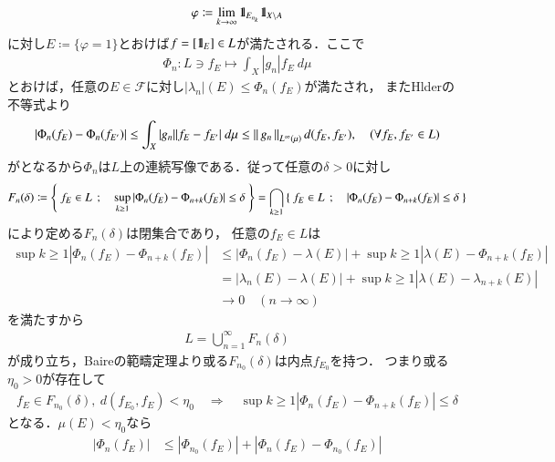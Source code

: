 \begin{prf}
\begin{description}
\begin{align}
					\varphi \coloneqq \lim_{k \to \infty} \mbox{1}\hspace{-0.25em}\mbox{l}_{E_{n_k}} \mbox{1}\hspace{-0.25em}\mbox{l}_{X \backslash A}
				\end{align}
				に対し$E \coloneqq \{\varphi = 1\}$とおけば$f = [\mbox{1}\hspace{-0.25em}\mbox{l}_E] \in L$が満たされる．ここで
				\begin{align}
					\Phi_n: L \ni f_E \longmapsto \int_X |g_n| f_E\ d\mu
				\end{align}
				とおけば，任意の$E \in \mathscr{F}$に対し$|\lambda_n|(E) \leq \Phi_n(f_E)$が満たされ，
				またHlderの不等式より
				\begin{align}
					\left| \Phi_n(f_E) - \Phi_n(f_{E'}) \right|
					\leq \int_X |g_n| |f_E - f_{E'}|\ d\mu
					\leq \left\|\, g_n\, \right\|_{L^\infty(\mu)} d(f_E,f_{E'}),
					\quad (\forall f_E,f_{E'} \in L)
				\end{align}
				がとなるから$\Phi_n$は$L$上の連続写像である．従って任意の$\delta > 0$に対し
				\begin{align}
					F_n(\delta) 
					\coloneqq \left\{\ f_E \in L\ \, ; \quad \operatorname*{sup}_{k \geq 1} \left| \Phi_n(f_E)-\Phi_{n+k}(f_E) \right| \leq \delta\ \right\}
					= \bigcap_{k \geq 1} \left\{\ f_E \in L\ \, ; \quad \left| \Phi_n(f_E)-\Phi_{n+k}(f_E) \right| \leq \delta\ \right\}
				\end{align}
				により定める$F_n(\delta)$は閉集合であり，
				任意の$f_E \in L$は
				\begin{align}
					\sup{k \geq 1}{\left| \Phi_n(f_E)-\Phi_{n+k}(f_E) \right|}
					&\leq \left| \Phi_n(f_E)-\lambda(E) \right|
						+ \sup{k \geq 1}{\left| \lambda(E)-\Phi_{n+k}(f_E) \right|} \\
					&= \left| \lambda_n(E)-\lambda(E) \right|
						+ \sup{k \geq 1}{\left| \lambda(E)-\lambda_{n+k}(E) \right|} \\
					&\longrightarrow 0 \quad (n \longrightarrow \infty)
				\end{align}
				を満たすから
				\begin{align}
					L = \bigcup_{n=1}^\infty F_n(\delta)
				\end{align}
				が成り立ち，Baireの範疇定理より或る$F_{n_0}(\delta)$は内点$f_{E_0}$を持つ．
				つまり或る$\eta_0 > 0$が存在して
				\begin{align}
					f_E \in F_{n_0}(\delta),\ d(f_{E_0},f_E) < \eta_0
					\quad \Rightarrow \quad
					\sup{k \geq 1}{\left| \Phi_n(f_E)-\Phi_{n+k}(f_E) \right|} \leq \delta
				\end{align}
				となる．$\mu(E) < \eta_0$なら
				\begin{align}
					\left|\Phi_n(f_E)\right| 
					&\leq \left|\Phi_{n_0}(f_E)\right| + \left|\Phi_n(f_E) - \Phi_{n_0}(f_E)\right| \\

\end{align}
\end{description}
\end{prf}
